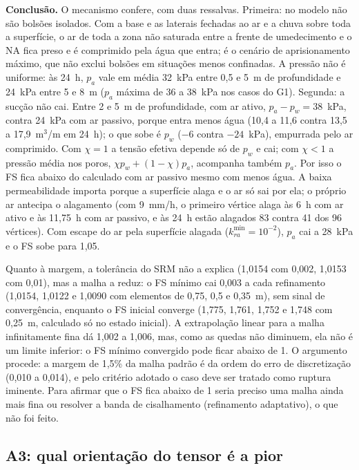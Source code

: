 \textbf{Conclus\~ao.} O mecanismo confere, com duas ressalvas. Primeira: no modelo n\~ao s\~ao bols\~oes isolados. Com
a base e as laterais fechadas ao ar e a chuva sobre toda a superf\'icie, o ar de toda a zona n\~ao saturada entre a
frente de umedecimento e o NA fica preso e \'e comprimido pela \'agua que entra; \'e o cen\'ario de aprisionamento
m\'aximo, que n\~ao exclui bols\~oes em situa\c{c}\~oes menos confinadas. A press\~ao n\~ao \'e uniforme: \`as 24~h, $p_a$
vale em m\'edia 32~kPa entre 0,5 e 5~m de profundidade e 24~kPa entre 5 e 8~m ($p_a$ m\'axima de 36 a 38~kPa nos casos
do G1). Segunda: a suc\c{c}\~ao n\~ao cai. Entre 2 e 5~m de profundidade, com ar ativo, $p_a-p_w=38$~kPa, contra 24~kPa
com ar passivo, porque entra menos \'agua (10,4 a 11,6 contra 13,5 a 17,9~m$^3$/m em 24~h); o que sobe \'e $p_w$ ($-6$
contra $-24$~kPa), empurrada pelo ar comprimido. Com $\chi=1$ a tens\~ao efetiva depende s\'o de $p_w$ e cai; com
$\chi<1$ a press\~ao m\'edia nos poros, $\chi p_w+(1-\chi)p_a$, acompanha tamb\'em $p_a$. Por isso o FS fica abaixo do
calculado com ar passivo mesmo com menos \'agua. A baixa permeabilidade importa porque a superf\'icie alaga e o ar s\'o
sai por ela; o pr\'oprio ar antecipa o alagamento (com 9~mm/h, o primeiro v\'ertice alaga \`as 6~h com ar ativo e \`as
11,75~h com ar passivo, e \`as 24~h est\~ao alagados 83 contra 41 dos 96 v\'ertices). Com escape do ar pela superf\'icie
alagada ($k_{ra}^{\min}=10^{-2}$), $p_a$ cai a 28~kPa e o FS sobe para 1,05.

Quanto \`a margem, a toler\^ancia do SRM n\~ao a explica (1,0154 com 0,002, 1,0153 com 0,01), mas a malha a reduz: o
FS m\'inimo cai 0,003 a cada refinamento (1,0154, 1,0122 e 1,0090 com elementos de 0,75, 0,5 e 0,35~m), sem sinal de
converg\^encia, enquanto o FS inicial converge (1,775, 1,761, 1,752 e 1,748 com 0,25~m, calculado s\'o no estado
inicial). A extrapola\c{c}\~ao linear para a malha infinitamente fina d\'a 1,002 a 1,006, mas, como as quedas n\~ao
diminuem, ela n\~ao \'e um limite inferior: o FS m\'inimo convergido pode ficar abaixo de 1. O argumento procede: a
margem de 1,5\% da malha padr\~ao \'e da ordem do erro de discretiza\c{c}\~ao (0,010 a 0,014), e pelo crit\'erio adotado
o caso deve ser tratado como ruptura iminente. Para afirmar que o FS fica abaixo de 1 seria preciso uma malha ainda mais
fina ou resolver a banda de cisalhamento (refinamento adaptativo), o que n\~ao foi feito.

\subsection{A3: qual orienta\c{c}\~ao do tensor \'e a pior}


